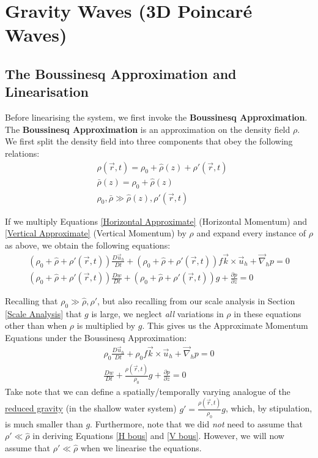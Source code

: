 \section{Gravity Waves (3D Poincaré Waves)}

\subsection{The Boussinesq Approximation and Linearisation}

Before linearising the system, we first invoke the \textbf{Boussinesq Approximation}. The \textbf{Boussinesq Approximation} is an approximation on the density field $\rho$. We first split the density field into three components that obey the following relations:
\begin{align*}
    &\rho(\vec{r},t)=\rho_0 + \hat{\rho}(z) + \rho'(\vec{r},t)
    \\
    &\bar{\rho}(z)=\rho_0 + \hat{\rho}(z)
    \\
    &\rho_0,\bar{\rho} \gg \hat{\rho}(z),\rho'(\vec{r},t)
\end{align*}

If we multiply Equations \ref{Horizontal Approximate} (Horizontal Momentum) and \ref{Vertical Approximate} (Vertical Momentum) by $\rho$ and expand every instance of $\rho$ as above, we obtain the following equations:
\begin{align*}
    (\rho_0+\hat{\rho}+\rho'(\vec{r},t))\frac{D\vec{u}_h}{Dt}+(\rho_0+\hat{\rho}+\rho'(\vec{r},t))f\vec{k}\times\vec{u}_h + \vec{\nabla}_h p = 0
    \\
    (\rho_0+\hat{\rho}+\rho'(\vec{r},t))\frac{Dw}{Dt}
    +
    (\rho_0+\hat{\rho}+\rho'(\vec{r},t))g + \frac{\partial p}{\partial z}= 0
\end{align*}

Recalling that $\rho_0 \gg \hat{\rho}, \rho'$, but also recalling from our scale analysis in Section \ref{Scale Analysis} that $g$ is large, we neglect \textit{all} variations in $\rho$ in these equations other than when $\rho$ is multiplied by $g$. This gives us the Approximate Momentum Equations under the Boussinesq Approximation:
\begin{align}
    \label{H bous}
    \boxed{
        \rho_0\frac{D\vec{u}_h}{Dt}+\rho_0f\vec{k}\times\vec{u}_h + \vec{\nabla}_h p = 0
    }
    \\
    \label{V bous}
    \boxed{\frac{Dw}{Dt}
    +
    \frac{\rho(\vec{r},t)}{\rho_0}g + \frac{\partial p}{\partial z}= 0}
\end{align}
Take note that we can define a spatially/temporally varying analogue of the \hyperref[RG Box]{reduced gravity} (in the shallow water system) $g'=\frac{\rho(\vec{r},t)}{\rho_0}g$, which, by stipulation, is much smaller than $g$. Furthermore, note that we did \textit{not} need to assume that $\rho'\ll \hat{\rho}$ in deriving Equations \ref{H bous} and \ref{V bous}. However, we will now assume that $\rho'\ll \hat{\rho}$ when we linearise the equations.

